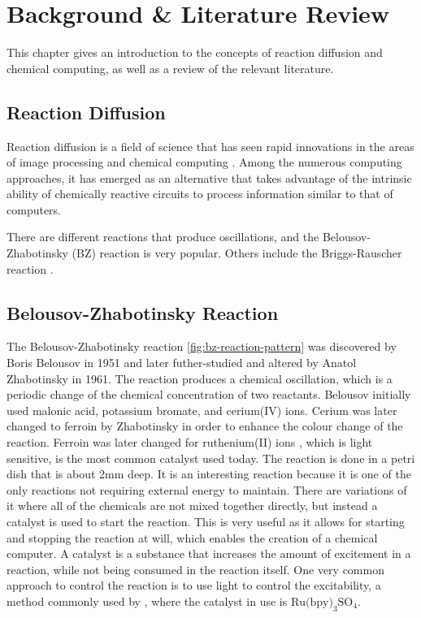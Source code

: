 \chapter{Background \& Literature Review} \label{ch:background-lit-review}
This chapter gives an introduction to the concepts of reaction diffusion and chemical computing,  as well as a review of the relevant literature.

\section{Reaction Diffusion}

Reaction diffusion is a field of science that has seen rapid innovations in the areas of image processing \citep{kuhnert1989image} and chemical computing \citep{dittrich2004chemical}. Among the numerous computing approaches, it has emerged as an alternative that takes advantage of the intrinsic ability of chemically reactive circuits to process information similar to that of computers. 

There are different reactions that produce oscillations, and the Belousov-Zhabotinsky (BZ) reaction is very popular. Others include the Briggs-Rauscher reaction \citep{de1982mechanistic}.
\section{Belousov-Zhabotinsky Reaction}
The Belousov-Zhabotinsky reaction \ref{fig:bz-reaction-pattern} was discovered by Boris Belousov in 1951 and later futher-studied and altered by Anatol Zhabotinsky in 1961. The reaction produces a chemical oscillation, which is a periodic change of the chemical concentration of two reactants. 
Belousov initially used malonic acid, potassium bromate, and cerium(IV) ions. Cerium was later changed to ferroin by Zhabotinsky in order to enhance the colour change of the reaction.
Ferroin was later changed for ruthenium(II) ions \citep{toth2006tris}, which is light sensitive, is the most common catalyst used today. The reaction is done in a petri dish that is about 2mm deep. 
It is an interesting reaction because it is one of the only reactions not requiring external energy to maintain. 
There are variations of it where all of the chemicals are not mixed together directly, but instead a catalyst is used to start the reaction.
This is very useful as it allows for starting and stopping the reaction at will, which enables the creation of a chemical computer.
A catalyst is a substance that increases the amount of excitement in a reaction, while not being consumed in the reaction itself.
One very common approach to control the reaction is to use light to control the excitability, a method commonly used by \cite{gorecki2003chemical}, where the catalyst in use is $\text{Ru(bpy)}_3\text{SO}_4$.

